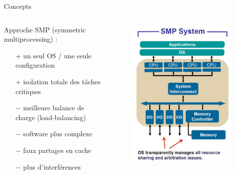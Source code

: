 \documentclass{beamer}
\begin{document}
\begin{frame}{Concepts}
	\begin{columns}
		\begingroup
		\small
		\hspace{0.3cm}
		\begin{column}{0.55\paperwidth}
			Approche SMP (symmetric multi\-processing) :
				\begin{itemize}
					\item[$+$] un seul OS / une seule configuration
					\item[$+$] isolation totale des tâches critiques
					\item[$-$] meilleure balance de charge (load-balancing)
					\item[$-$] software plus complexe
					\item[$-$] faux partages en cache
					\item[$-$] plus d'interférences
				\end{itemize}
		\end{column}
		\endgroup
		\begin{column}{0.45\paperwidth}
			\begin{figure}
				\centering
				\includegraphics[width=0.7\linewidth]{smp.png}
			\end{figure}	
		\end{column}
	\end{columns}
\end{frame}
\end{document}
